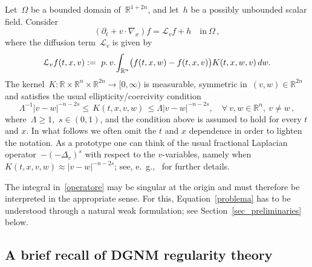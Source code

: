 \documentclass[leqno,10pt]{amsart}
\theoremstyle{plain}
\theoremstyle{remark}
\numberwithin{equation}{section}
\def\dw{\,{\rm d}w}
\def\er{\mathbb{R}}
\def\ern{\mathbb{R}^n}
\def\Om{\Omega}
\newcommand{\Lc}{\mathcal{L}_v}
\begin{document}
\medskip
Let~$\Om$ be a bounded domain of~$\er^{1+2n}$, and let~$h$ be a possibly unbounded scalar field. Consider
\begin{equation}\label{problema}
	(\partial_t  + v\cdot \nabla_x) f = \Lc f + h  \quad \mbox{in}~\Omega\,,
\end{equation}
where the diffusion term~$\Lc$ is given by
\begin{equation}\label{operatore}
	\Lc f(t,x,v)
	:=\displaystyle  \ {p.~\!v.}\!\int_{\ern}\! \big(f(t,x,w)-f(t,x,v)\big)K(t,x,w,v)\dw.
\end{equation}
The kernel~$K:\er\times\er^n\times\er^{2n}\to[0,\infty)$
is measurable, symmetric in~$(v,w) \in \er^{2n}$ and satisfies the usual ellipticity/coercivity condition
\begin{equation}\label{def_kkk}
	\Lambda^{-1}|v-w|^{-n-2s} \leq \, K(t,x,v,w)\, \leq \Lambda|v-w|^{-n-2s}, \quad \forall\ v,w \in \er^n,~v\neq w\,,
\end{equation}
where~$\Lambda\geq 1$,~$s\in (0,1)$, and the condition above is assumed to hold for every $t$ and $x$. In what follows we often omit the $t$ and $x$ dependence in order to lighten the notation. As a prototype one can think of the usual fractional Laplacian operator~$-(-\Delta_v)^s$ with respect to the $v$-variables, namely when~$K(t,x,v,w) \approx |v-w|^{-n-2s}$; see, e.~\!g.,~\cite[Section~2]{DPV12} for further details.  

The integral in~\eqref{operatore} may be singular at the origin and must therefore be interpreted in the appropriate sense. For this, Equation~\eqref{problema} has to be understood through a natural weak formulation; see Section~\ref{sec_preliminaries} below.
 

\subsection{A brief recall of DGNM regularity theory}
\end{document}
